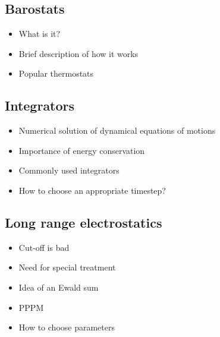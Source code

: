 \documentclass[9pt,bestpractices]{livecoms}
\begin{document}
\subsection{Barostats}
\begin{itemize}
\item What is it?
\item Brief description of how it works
\item Popular thermostats
\end{itemize}

\subsection{Integrators}
\begin{itemize}
\item Numerical solution of dynamical equations of motions
\item Importance of energy conservation
\item Commonly used integrators
\item How to choose an appropriate timestep?
\end{itemize}

\subsection{Long range electrostatics}
\begin{itemize}
\item Cut-off is bad
\item Need for special treatment
\item Idea of an Ewald sum
\item PPPM
\item How to choose parameters
\end{itemize}
\end{document}
